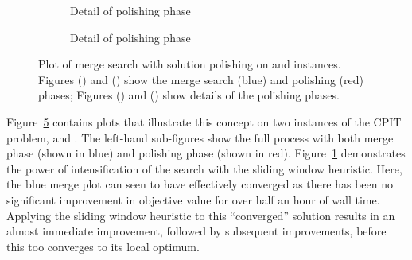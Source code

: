 \documentclass[journal]{IEEEtran}
\begin{document}
\begin{figure}[t!]
    \centering
    \begin{subfigure}[t]{0.23\textwidth}
    \centering
    \vspace*{-5mm}\caption{\zuckmed{}}
    \label{plot:polish.med1}
    \end{subfigure}
    \quad
    \begin{subfigure}[t]{0.23\textwidth}
    \centering
    \caption{Detail of polishing phase}
    \label{plot:polish.med2}
    \end{subfigure}
    \quad
    \centering
    \begin{subfigure}[t]{0.23\textwidth}
    \centering
    \vspace*{-5mm}\caption{\zucklarge{}}
    \label{plot:polish.large1}
    \end{subfigure}
    \quad
    \begin{subfigure}[t]{0.23\textwidth}
    \centering
    \vspace*{-5mm}\caption{Detail of polishing phase}
    \label{plot:polish.large2}
    \end{subfigure}
    \caption[Plot of merge search with solution polishing on \zuckmed{} and \zucklarge{} instances]{Plot of merge search with solution polishing on \zuckmed{} and \zucklarge{} instances. Figures () and () show the merge search (blue) and polishing (red) phases; Figures () and () show details of the polishing phases.}
    \label{plot:mine:polish}
\end{figure}

Figure~\ref{plot:mine:polish} contains plots that illustrate this concept on two instances of the CPIT problem, \zuckmed{} and \zucklarge{}. The left-hand sub-figures show the full process with both merge phase (shown in blue) and polishing phase (shown in red). Figure~\ref{plot:polish.med1} demonstrates the power of intensification of the search with the sliding window heuristic. Here, the blue merge plot can seen to have effectively converged as there has been no significant improvement in objective value for over half an hour of wall time. Applying the sliding window heuristic to this ``converged'' solution results in an almost immediate improvement, followed by subsequent improvements, before this too converges to its local optimum.
\end{document}
